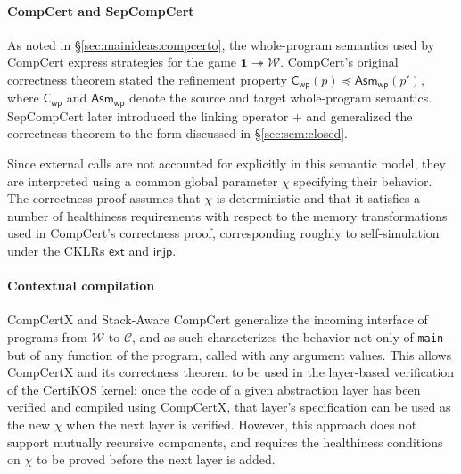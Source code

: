 \documentclass[draft,11pt]{report}
\newcommand{\kw}[1]{\ensuremath{ \mathsf{#1} }}
\newcommand{\refby}{\preceq}     %
\begin{document}
\paragraph{CompCert and SepCompCert} %

As noted in \S\ref{sec:mainideas:compcerto},
the whole-program semantics used by CompCert
express strategies for the game
$\mathbf{1} \twoheadrightarrow \mathcal{W}$.
CompCert's original correctness theorem
stated the refinement property
$\kw{C}_\kw{wp}(p) \refby \kw{Asm}_\kw{wp}(p')$,
where $\kw{C}_\kw{wp}$ and $\kw{Asm}_\kw{wp}$
denote the source and target whole-program semantics.
SepCompCert \cite{sepcompcert}
later introduced the linking operator $+$
and generalized the correctness theorem to
the form discussed in \S\ref{sec:sem:closed}.

Since external calls are not accounted for explicitly
in this semantic model,
they are interpreted %
using a common global parameter $\chi$
specifying their behavior.
The correctness proof assumes that $\chi$ is deterministic
and that it satisfies a number of healthiness requirements
with respect to the memory transformations
used in CompCert's correctness proof,
corresponding roughly to self-simulation
under the CKLRs $\kw{ext}$ and $\kw{injp}$.


\paragraph{Contextual compilation} %

CompCertX \cite{popl15} and
Stack-Aware CompCert \cite{stackaware}
generalize
the incoming interface of programs
from $\mathcal{W}$ to $\mathcal{C}$,
and as such characterizes the behavior
not only of \texttt{main}
but of any function of the program,
called with any argument values.
This allows CompCertX and its correctness theorem
to be used in the layer-based verification of
the CertiKOS kernel:
once the code of a given abstraction layer has been verified
and compiled using CompCertX,
that layer's specification can be used as the new $\chi$
when the next layer is verified.
However,
this approach does not support
mutually recursive components,
and requires the healthiness conditions on $\chi$
to be proved before the next layer is added.
\end{document}
